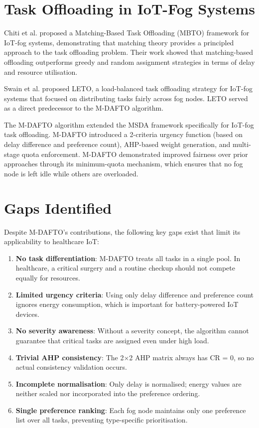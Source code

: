 \section{Task Offloading in IoT-Fog Systems}

Chiti et al. \cite{chiti2018matching} proposed a Matching-Based Task Offloading (MBTO) framework for IoT-fog systems, demonstrating that matching theory provides a principled approach to the task offloading problem. Their work showed that matching-based offloading outperforms greedy and random assignment strategies in terms of delay and resource utilisation.

Swain et al. \cite{swain2021leto} proposed LETO, a load-balanced task offloading strategy for IoT-fog systems that focused on distributing tasks fairly across fog nodes. LETO served as a direct predecessor to the M-DAFTO algorithm.

The M-DAFTO algorithm \cite{swain2024mdafto} extended the MSDA framework specifically for IoT-fog task offloading. M-DAFTO introduced a 2-criteria urgency function (based on delay difference and preference count), AHP-based weight generation, and multi-stage quota enforcement. M-DAFTO demonstrated improved fairness over prior approaches through its minimum-quota mechanism, which ensures that no fog node is left idle while others are overloaded.

\section{Gaps Identified}

Despite M-DAFTO's contributions, the following key gaps exist that limit its applicability to healthcare IoT:

\begin{enumerate}
\item \textbf{No task differentiation}: M-DAFTO treats all tasks in a single pool. In healthcare, a critical surgery and a routine checkup should not compete equally for resources.
\item \textbf{Limited urgency criteria}: Using only delay difference and preference count ignores energy consumption, which is important for battery-powered IoT devices.
\item \textbf{No severity awareness}: Without a severity concept, the algorithm cannot guarantee that critical tasks are assigned even under high load.
\item \textbf{Trivial AHP consistency}: The 2$\times$2 AHP matrix always has CR = 0, so no actual consistency validation occurs.
\item \textbf{Incomplete normalisation}: Only delay is normalised; energy values are neither scaled nor incorporated into the preference ordering.
\item \textbf{Single preference ranking}: Each fog node maintains only one preference list over all tasks, preventing type-specific prioritisation.
\end{enumerate}


